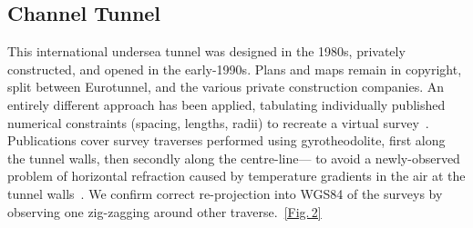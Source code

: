 \documentclass[conference,a4paper]{IEEEtran}
\begin{document}
\subsection{Channel Tunnel}%
\vspace{-0.112em}

This international undersea tunnel was designed in the 1980s,
privately constructed, and opened in the early-1990s.  Plans and maps
remain in copyright, split between Eurotunnel, and the various private
construction companies.  An entirely different approach has
been applied, tabulating individually published numerical
constraints (spacing, lengths, radii) to recreate a virtual survey~\cite{osm-wiki-chunnel,sladen-sotm2013}.
Publications cover
survey traverses performed using gyrotheodolite, first along the tunnel walls, then secondly along the centre-line---%
to avoid a newly-observed problem of horizontal
refraction caused by temperature gradients in the air at the tunnel walls~\cite{korittke-1997,korittke-1989}.
We confirm correct re-projection into WGS84 of the surveys by observing
one zig-zagging around other traverse.~\hfill\hyperref[fig:osm-chunnel-traverse]{[Fig.\,2]}\par\vspace*{\fill}
\end{document}
